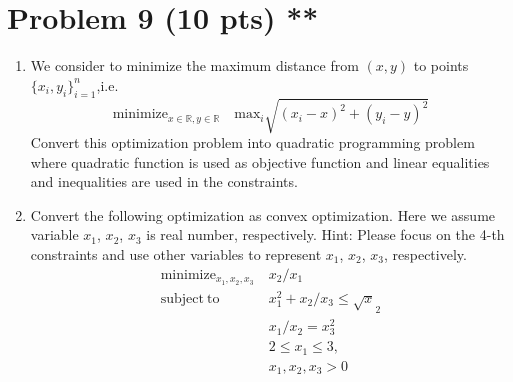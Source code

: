 \documentclass{jsarticle}
\begin{document}
\section*{Problem 9 (10 pts) **}
\begin{enumerate}
  \item We consider to minimize the maximum distance from $(x,y)$ to points $\{x_i,y_i\}^n_{i=1}$,i.e.
  $$
  \mathrm{minimize}_{x\in\mathbb R,y\in\mathbb R}\quad\mathrm{max}_i\sqrt{(x_i-x)^2+(y_i-y)^2}
  $$
  Convert this optimization problem into quadratic programming problem where quadratic function is used as objective function and linear equalities and inequalities are used in the constraints.
  \item Convert the following optimization as convex optimization. Here we assume variable $x_1$, $x_2$, $x_3$ is real number, respectively. Hint: Please focus on the 4-th constraints and use other variables to represent $x_1$, $x_2$, $x_3$, respectively.
  \begin{align}
    \nonumber
    \mathrm{minimize}_{x_1,x_2,x_3}&\ x_2/x_1 \\
    \nonumber
    \mathrm{subject\ to}&\ x_1^2+x_2/x_3 \le \sqrt x_2 \\
    \nonumber
    &\ x_1/x_2 = x_3^2 \\
    \nonumber
    &\ 2 \le x_1 \le3, \\
    \nonumber
    &\ x_1,x_2,x_3 >0 
  \end{align}
\end{enumerate}

　　
\end{document}
